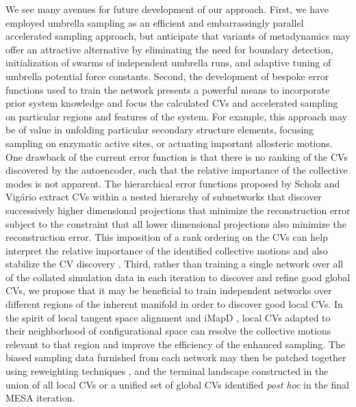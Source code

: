 \documentclass[12pt]{article}
\begin{document}
We see many avenues for future development of our approach. First, we have employed umbrella sampling as an efficient and embarrassingly parallel accelerated sampling approach, but anticipate that variants of metadynamics \cite{laio2002escaping,huber1994local,barducci2008well} may offer an attractive alternative by eliminating the need for boundary detection, initialization of swarms of independent umbrella runs, and adaptive tuning of umbrella potential force constants. Second, the development of bespoke error functions used to train the network presents a powerful means to incorporate prior system knowledge and focus the calculated CVs and accelerated sampling on particular regions and features of the system. For example, this approach may be of value in unfolding particular secondary structure elements, focusing sampling on enzymatic active sites, or actuating important allosteric motions. One drawback of the current error function is that there is no ranking of the CVs discovered by the autoencoder, such that the relative importance of the collective modes is not apparent. The hierarchical error functions proposed by Scholz and Vig\'{a}rio \cite{scholz2008nonlinear,scholz2002nonlinear} extract CVs within a nested hierarchy of subnetworks that discover successively higher dimensional projections that minimize the reconstruction error subject to the constraint that all lower dimensional projections also minimize the reconstruction error. This imposition of a rank ordering on the CVs can help interpret the relative importance of the identified collective motions and also stabilize the CV discovery \cite{scholz2008nonlinear}. Third, rather than training a single network over all of the collated simulation data in each iteration to discover and refine good global CVs, we propose that it may be beneficial to train independent networks over different regions of the inherent manifold in order to discover good local CVs. In the spirit of local tangent space alignment \cite{wang2011geometric} and iMapD \cite{chiavazzo2017intrinsic}, local CVs adapted to their neighborhood of configurational space can resolve the collective motions relevant to that region and improve the efficiency of the enhanced sampling. The biased sampling data furnished from each network may then be patched together using reweighting techniques \cite{ferguson2017bayeswham}, and the terminal landscape constructed in the union of all local CVs or a unified set of global CVs identified \textit{post hoc} in the final MESA iteration.
\end{document}
